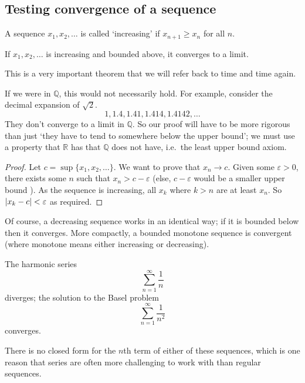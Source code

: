\subsection{Testing convergence of a sequence}
A sequence \(x_1, x_2, \dots\) is called `increasing' if \(x_{n+1} \geq x_n\) for all \(n\).
\begin{theorem}
	If \(x_1, x_2, \dots\) is increasing and bounded above, it converges to a limit.
\end{theorem}
This is a very important theorem that we will refer back to time and time again.
\begin{note}
	If we were in \(\mathbb Q\), this would not necessarily hold.
	For example, consider the decimal expansion of \(\sqrt{2}\).
	\[1, 1.4, 1.41, 1.414, 1.4142, \dots\]
	They don't converge to a limit in \(\mathbb Q\).
	So our proof will have to be more rigorous than just `they have to tend to somewhere below the upper bound'; we must use a property that \(\mathbb R\) has that \(\mathbb Q\) does not have, i.e.\ the least upper bound axiom.
\end{note}
\begin{proof}
	Let \(c = \sup \{ x_1, x_2, \dots \}\).
	We want to prove that \(x_n \to c\).
	Given some \(\varepsilon > 0\), there exists some \(n\) such that \(x_n > c - \varepsilon\) (else, \(c - \varepsilon\) would be a smaller upper bound \contradiction).
	As the sequence is increasing, all \(x_k\) where \(k > n\) are at least \(x_n\).
	So \(\abs{x_k - c} < \varepsilon\) as required.
\end{proof}
Of course, a decreasing sequence works in an identical way; if it is bounded below then it converges.
More compactly, a bounded monotone sequence is convergent (where monotone means either increasing or decreasing).
\begin{proposition}
	The harmonic series
	\[
		\sum_{n=1}^\infty \frac 1 n
	\]
	diverges; the solution to the Basel problem
	\[
		\sum_{n=1}^\infty \frac 1 {n^2}
	\]
	converges.
\end{proposition}
There is no closed form for the \(n\)th term of either of these sequences, which is one reason that series are often more challenging to work with than regular sequences.
